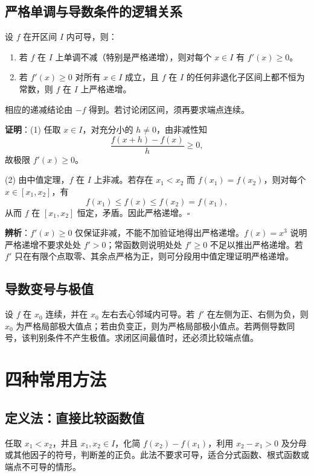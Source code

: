 \subsection{严格单调与导数条件的逻辑关系}
\begin{knowledgebox}[title=定理 1A：导数必要条件与严格单调判别]
设 $f$ 在开区间 $I$ 内可导，则：
\begin{enumerate}[label=(\arabic*)]
\item 若 $f$ 在 $I$ 上单调不减（特别是严格递增），则对每个 $x\in I$ 有 $f'(x)\ge0$。
\item 若 $f'(x)\ge0$ 对所有 $x\in I$ 成立，且 $f$ 在 $I$ 的任何非退化子区间上都不恒为常数，则 $f$ 在 $I$ 上严格递增。
\end{enumerate}
相应的递减结论由 $-f$ 得到。若讨论闭区间，须再要求端点连续。
\end{knowledgebox}
\textbf{证明}：(1) 任取 $x\in I$，对充分小的 $h\ne0$，由非减性知
\[
\frac{f(x+h)-f(x)}{h}\ge0,
\]
故极限 $f'(x)\ge0$。

(2) 由中值定理，$f$ 在 $I$ 上非减。若存在 $x_1<x_2$ 而 $f(x_1)=f(x_2)$，则对每个 $x\in[x_1,x_2]$，有
\[
f(x_1)\le f(x)\le f(x_2)=f(x_1),
\]
从而 $f$ 在 $[x_1,x_2]$ 恒定，矛盾。因此严格递增。$\square$

\begin{methodbox}
\textbf{辨析}：$f'(x)\ge0$ 仅保证非减，不能不加验证地得出严格递增。$f(x)=x^3$ 说明严格递增不要求处处 $f'>0$；常函数则说明处处 $f'\ge0$ 不足以推出严格递增。若 $f'$ 只在有限个点取零、其余点严格为正，则可分段用中值定理证明严格递增。
\end{methodbox}

\subsection{导数变号与极值}
设 $f$ 在 $x_0$ 连续，并在 $x_0$ 左右去心邻域内可导。若 $f'$ 在左侧为正、右侧为负，则 $x_0$ 为严格局部极大值点；若由负变正，则为严格局部极小值点。若两侧导数同号，该判别条件不产生极值。求闭区间最值时，还必须比较端点值。

\section{四种常用方法}

\subsection{定义法：直接比较函数值}
\begin{methodbox}
任取 $x_1<x_2$，并且 $x_1,x_2\in I$，化简 $f(x_2)-f(x_1)$，利用 $x_2-x_1>0$ 及分母或其他因子的符号，判断差的正负。此法不要求可导，适合分式函数、根式函数或端点不可导的情形。
\end{methodbox}

